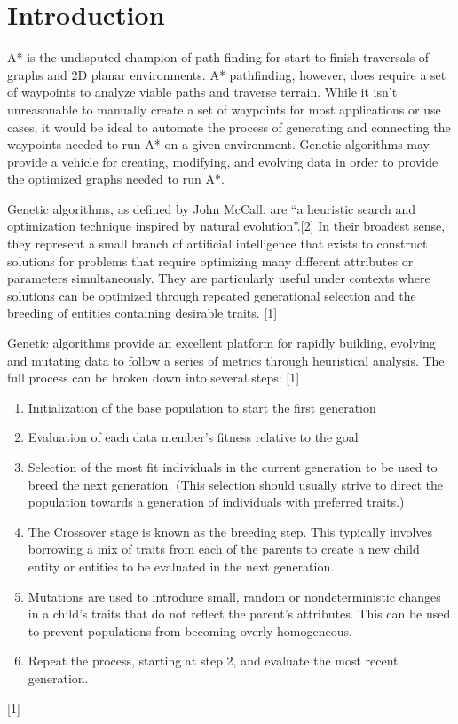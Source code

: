 \section{Introduction}
	A* is the undisputed champion of path finding for start-to-finish traversals of graphs and 2D planar environments. A* pathfinding, however, does require a set of waypoints to analyze viable paths and traverse terrain. While it isn't unreasonable to manually create a set of waypoints for most applications or use cases, it would be ideal to automate the process of generating and connecting the waypoints needed to run A* on a given environment. Genetic algorithms may provide a vehicle for creating, modifying, and evolving data in order to provide the optimized graphs needed to run A*.
	
	Genetic algorithms, as defined by John McCall, are “a heuristic search and optimization technique inspired by natural evolution”.[2] In their broadest sense, they represent a small branch of artificial intelligence that exists to construct solutions for problems that require optimizing many different attributes or parameters simultaneously. They are particularly useful under contexts where solutions can be optimized through repeated generational selection and the breeding of entities containing desirable traits. [1]
	
	Genetic algorithms provide an excellent platform for rapidly building, evolving and mutating data to follow a series of metrics through heuristical analysis. The full process can be broken down into several steps: [1]
	
	\begin{enumerate}
		\item Initialization of the base population to start the first generation
		\item Evaluation of each data member's fitness relative to the goal
		\item Selection of the most fit individuals in the current generation to be used to breed the next generation. (This selection should usually strive to direct the population towards a generation of individuals with preferred traits.)
		\item The Crossover stage is known as the breeding step. This typically involves borrowing a mix of traits from each of the parents to create a new child entity or entities to be evaluated in the next generation.
		\item Mutations are used to introduce small, random or nondeterministic changes in a child's traits that do not reflect the parent’s attributes. This can be used to prevent populations from becoming overly homogeneous.
		\item Repeat the process, starting at step 2, and evaluate the most recent generation.
	\end{enumerate}
	[1]
	
